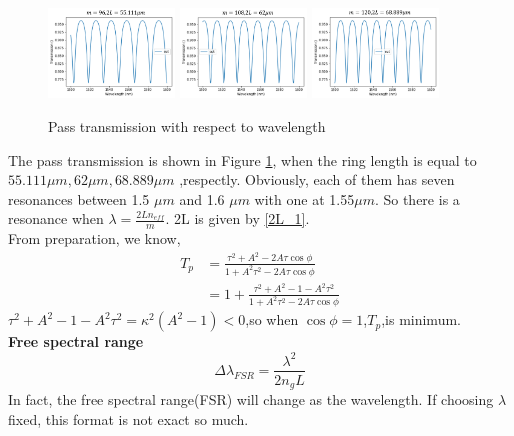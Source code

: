 \documentclass[fontsize=11pt]{scrartcl}
\begin{document}
\begin{figure}[ht]
    \centering
    \includegraphics[width=0.3\textwidth]{img/t1_n96.png}
    \includegraphics[width=0.3\textwidth]{img/t1_n108.png}
    \includegraphics[width=0.3\textwidth]{img/t1_n120.png}
    \caption{Pass transmission with respect to wavelength}
    \label{t1_tp}
\end{figure}
The pass transmission is shown in Figure \ref{t1_tp}, when the ring length is equal to $55.111\mu m, 62\mu m,68.889\mu m$ ,respectly.
Obviously, each of them has seven resonances between 1.5 $\mu m$ and 1.6 $\mu m$ with one at 1.55$\mu m$.
So there is a resonance when $\lambda=\frac{2Ln_{eff}} m$. 2L is given by \ref{2L_1}.\\
From preparation, we know,
\begin{equation}
    \begin{split}
        T_p & =\frac{\tau^2+A^2-2A\tau \cos{\phi}}{1+A^2\tau^2-2A\tau\cos{\phi}}  \\
            & =1+\frac{\tau^2+A^2-1-A^2\tau^2}   {1+A^2\tau^2-2A\tau\cos{\phi}}
    \end{split}
\end{equation}
$\tau^2+A^2-1-A^2\tau^2=\kappa^2(A^2-1)<0$,so when $\cos \phi=1$,$T_p$,is minimum.\\
\textbf{Free spectral range}
\begin{equation}
    \Delta\lambda_{FSR}=\frac{\lambda^2}{2n_gL}
\end{equation}
In fact, the free spectral range(FSR) will change as the wavelength. If choosing $\lambda$ fixed, this format is not exact so much.
\end{document}
